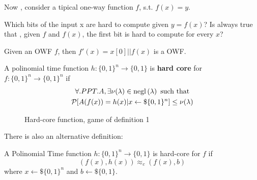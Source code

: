 Now , consider a tipical one-way function $f$, s.t. $f(x)=y$.
\begin{question}
    Which  bits of the input x are hard to compute given $y=f(x)$?
    Is always true that , given $f$ and $f(x)$, the first bit is hard to compute
    for every $x$?
\end{question}

\begin{example}
    Given an OWF $f$, then $f'(x)= x[0]||f(x)$ is a OWF.
\end{example}

\begin{defn}
    A polinomial time function $ h:\{0,1\}^{n} \to \{0,1\} $ is \textbf{hard
    core} for $ f:\{0,1\}^{n} \to \{0,1\}^{n} $ if 
    \begin{gather*}
        \forall.PPT. A, \exists \nu(\lambda) \in \mathrm{negl}\left({\lambda}\right) \text{  such
        that}\\
        \mathcal{P} [ A(f(x))= h(x)|x \leftarrow\$ \{0,1\}^{n} ] \leq \nu(\lambda)      
    \end{gather*}
    
\end{defn}
\newpage

\begin{figure}[h!]
   \centering
   \sdinit{}
   \caption{Hard-core function, game of definition 1}
   \label{fig:def1hcf}
\end{figure}


There is also an alternative definition:
\begin{defn}
    A Polinomial Time function $h:\{0,1\}^{n} \to \{0,1\} $ is hard-core for $f$
    if
    \[
        (f(x), h(x)) \approx_{c} (f(x), b)
    \]
    where $x \leftarrow\$\{0,1\}^{n}$ and $b \leftarrow\$\{0,1\}$.
\end{defn}


